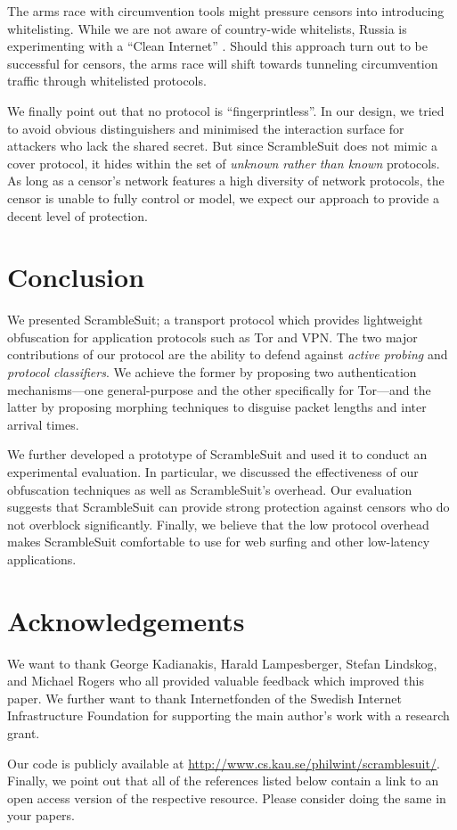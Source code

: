 \documentclass{sig-alternate}
\newcommand{\pt}{\textsf{ScrambleSuit}}
\numberwithin{enumi}{section}
\numberwithin{notesctr}{section}
\begin{document}
The arms race with circumvention tools might pressure censors into introducing whitelisting. While
we are not aware of country-wide whitelists, Russia is experimenting with a ``Clean Internet''
\cite{russiawl}. Should this approach turn out to be successful for censors, the arms race will
shift towards tunneling circumvention traffic through whitelisted protocols.

We finally point out that no protocol is ``fingerprintless''. In our design, we tried to avoid
obvious distinguishers and minimised the interaction surface for attackers who lack the shared
secret. But since \pt{} does not mimic a cover protocol, it hides within the set of \emph{unknown
rather than known} protocols. As long as a censor's network features a high diversity of
network protocols, the censor is unable to fully control or model, we expect our approach to provide
a decent level of protection.


\section{Conclusion}
\label{sec:conclusion}
We presented \pt{}; a transport protocol which provides lightweight obfuscation for application
protocols such as Tor and VPN. The two major contributions of our protocol are the ability to defend
against \emph{active probing} and \emph{protocol classifiers}. We achieve the former by proposing
two authentication mechanisms---one general-purpose and the other specifically for Tor---and the
latter by proposing morphing techniques to disguise packet lengths and inter arrival times.

We further developed a prototype of \pt{} and used it to conduct an experimental evaluation. In
particular, we discussed the effectiveness of our obfuscation techniques as well as \pt{}'s
overhead. Our evaluation suggests that \pt{} can provide strong protection against censors who do
not overblock significantly. Finally, we believe that the low protocol overhead makes \pt{}
comfortable to use for web surfing and other low-latency applications.


\section*{Acknowledgements}
We want to thank George Kadianakis, Harald Lampesberger, Stefan Lindskog, and Michael Rogers who all
provided valuable feedback which improved this paper. We further want to thank Internetfonden
of the Swedish Internet Infrastructure Foundation for supporting the main author's work with a
research grant.

Our code is publicly available at
\url{http://www.cs.kau.se/philwint/scramblesuit/}. Finally, we point out that all of the references
listed below contain a link to an open access version of the respective resource. Please consider
doing the same in your papers.

\printbibliography
\end{document}
